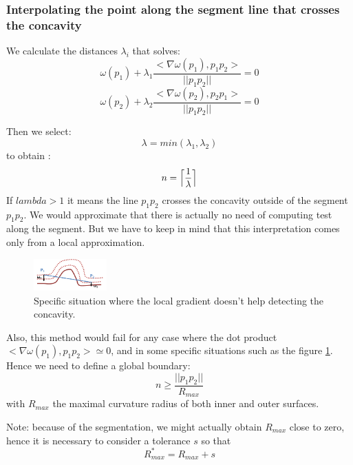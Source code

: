 \documentclass[11pt,a4paper]{article}
\begin{document}
\subsubsection{Interpolating the point along the segment line that crosses the concavity} \label{subsec}
We calculate the distances $\lambda_i$ that solves:
\begin{equation}
\omega (p_1) + \lambda_1 \frac{<\nabla \omega(p_1), p_1p_2>}{||p_1p_2||} = 0 
\end{equation}
\begin{equation}
\omega (p_2) + \lambda_2\frac{<\nabla \omega(p_2), p_2p_1>}{||p_1p_2||} = 0
\end{equation}

Then we select:
\begin{equation}
\lambda = min(\lambda_1, \lambda_2)
\end{equation}
to obtain :
\begin{equation}
n = \Bigl\lceil \frac{1}{\lambda} \Bigr\rceil
\end{equation}
If $lambda > 1$ it means the line $p_1p_2$ crosses the concavity outside of the segment $p_1p_2$. We would approximate that there is actually no need of computing test along the segment. But we have to keep in mind that this interpretation comes only from a local approximation.

\begin{figure}[h!]
			\label{spe issue}
			\centering
			\includegraphics[width=0.25\textwidth]{Drawings/CurvatureTestExample1.png}
			\caption{Specific situation where the local gradient doesn't help detecting the concavity.}
\end{figure}
Also, this method would fail for any case where the dot product $<\nabla \omega(p_1), p_1p_2> \simeq 0$, and in some specific situations such as the figure \ref{spe issue}. Hence we need to define a global boundary:
\begin{equation}
n \geq \frac{||p_1p_2||}{R_{max}} 
\end{equation}
with $R_{max}$ the maximal curvature radius of both inner and outer surfaces.

Note: because of the segmentation, we might actually obtain $R_{max}$ close to zero, hence it is necessary to consider a tolerance $s$ so that 
\begin{equation}
R_{max}^* = R_{max} + s
\end{equation}
\end{document}
